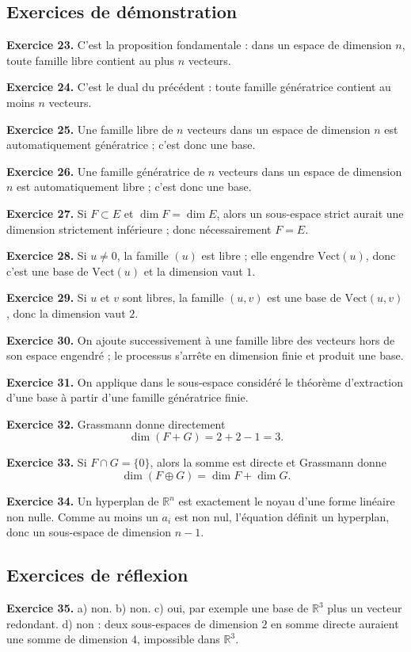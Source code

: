 \documentclass[11pt,a4paper]{article}
\newcommand{\R}{\mathbb R}
\newcommand{\Vect}{\mathrm{Vect}}
\begin{document}
\subsection*{Exercices de démonstration}
\textbf{Exercice 23.} C'est la proposition fondamentale : dans un espace de dimension $n$, toute famille libre contient au plus $n$ vecteurs.

\textbf{Exercice 24.} C'est le dual du précédent : toute famille génératrice contient au moins $n$ vecteurs.

\textbf{Exercice 25.} Une famille libre de $n$ vecteurs dans un espace de dimension $n$ est automatiquement génératrice ; c'est donc une base.

\textbf{Exercice 26.} Une famille génératrice de $n$ vecteurs dans un espace de dimension $n$ est automatiquement libre ; c'est donc une base.

\textbf{Exercice 27.} Si $F\subset E$ et $\dim F=\dim E$, alors un sous-espace strict aurait une dimension strictement inférieure ; donc nécessairement $F=E$.

\textbf{Exercice 28.} Si $u\neq 0$, la famille $(u)$ est libre ; elle engendre $\Vect(u)$, donc c'est une base de $\Vect(u)$ et la dimension vaut $1$.

\textbf{Exercice 29.} Si $u$ et $v$ sont libres, la famille $(u,v)$ est une base de $\Vect(u,v)$, donc la dimension vaut $2$.

\textbf{Exercice 30.} On ajoute successivement à une famille libre des vecteurs hors de son espace engendré ; le processus s'arrête en dimension finie et produit une base.

\textbf{Exercice 31.} On applique dans le sous-espace considéré le théorème d'extraction d'une base à partir d'une famille génératrice finie.

\textbf{Exercice 32.} Grassmann donne directement
\[\dim(F+G)=2+2-1=3.\]

\textbf{Exercice 33.} Si $F\cap G=\{0\}$, alors la somme est directe et Grassmann donne
\[\dim(F\oplus G)=\dim F+\dim G.\]

\textbf{Exercice 34.} Un hyperplan de $\R^n$ est exactement le noyau d'une forme linéaire non nulle. Comme au moins un $a_i$ est non nul, l'équation définit un hyperplan, donc un sous-espace de dimension $n-1$.

\subsection*{Exercices de réflexion}
\textbf{Exercice 35.} a) non. b) non. c) oui, par exemple une base de $\R^3$ plus un vecteur redondant. d) non : deux sous-espaces de dimension $2$ en somme directe auraient une somme de dimension $4$, impossible dans $\R^3$.
\end{document}

